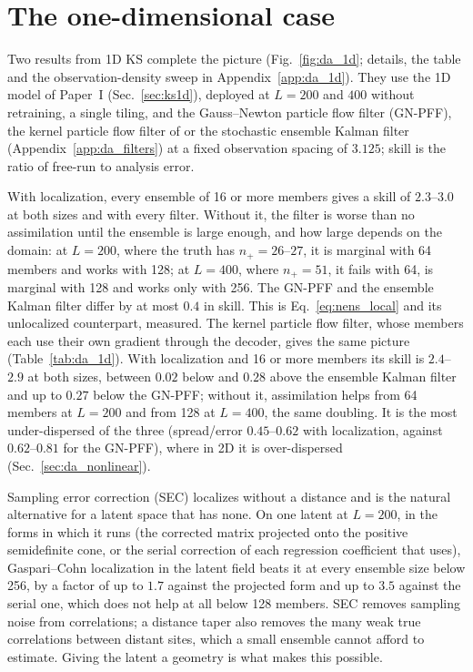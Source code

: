 \section{The one-dimensional case}
\label{sec:da_1d}

Two results from 1D KS complete the picture (Fig.~\ref{fig:da_1d};
details, the table and the observation-density sweep in
Appendix~\ref{app:da_1d}). They use the 1D model of Paper~I (Sec.~\ref{sec:ks1d}), deployed at
$L=200$ and $400$ without retraining, a single tiling, and the Gauss--Newton particle flow
filter (GN-PFF), the kernel particle flow filter of \citet{huvanleeuwen2021} or the stochastic
ensemble Kalman filter (Appendix~\ref{app:da_filters}) at a fixed observation
spacing of $3.125$; skill is the ratio of free-run to analysis error.

With localization, every ensemble of 16 or more members gives a skill of
$2.3$--$3.0$ at both sizes and with every filter. Without it, the filter is
worse than no assimilation until the ensemble is large enough, and how
large depends on the domain: at $L=200$, where the truth has $n_+=26$--$27$, it is
marginal with 64 members and works with 128; at $L=400$, where $n_+=51$, it
fails with 64, is marginal with 128 and works only with 256. The GN-PFF and the ensemble Kalman filter differ by at most $0.4$ in
skill. This is Eq.~\eqref{eq:nens_local} and its unlocalized counterpart, measured.
The kernel particle flow filter, whose members each use their own gradient
through the decoder, gives the same picture (Table~\ref{tab:da_1d}). With
localization and 16 or more members its skill is $2.4$--$2.9$ at both sizes,
between $0.02$ below and $0.28$ above the ensemble Kalman filter and up to
$0.27$ below the GN-PFF; without it, assimilation helps from 64 members at
$L=200$ and from 128 at $L=400$, the same doubling. It is the most
under-dispersed of the three (spread/error $0.45$--$0.62$ with localization,
against $0.62$--$0.81$ for the GN-PFF), where in 2D it is over-dispersed
(Sec.~\ref{sec:da_nonlinear}).

 Sampling error
correction (SEC) \citep{anderson2012} localizes without a distance and is the
natural alternative for a latent space that has none. On one latent at
$L=200$, in the forms in which it runs (the corrected matrix projected onto
the positive semidefinite cone, or the serial correction of each
regression coefficient that \citet{anderson2012} uses), Gaspari--Cohn
localization in the latent field beats it at every ensemble size below
256, by a factor of up to $1.7$ against the projected form and up to $3.5$
against the serial one, which does not help at all below 128 members.
SEC removes sampling noise from correlations; a distance taper also
removes the many weak true correlations between distant sites, which a
small ensemble cannot afford to estimate. Giving the latent a geometry is
what makes this possible.


